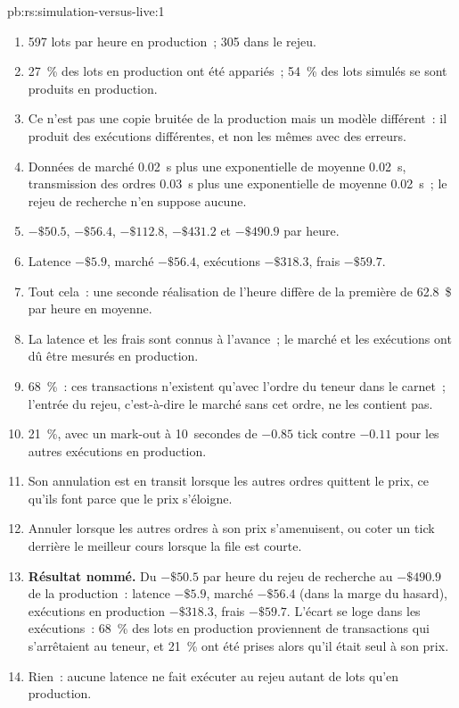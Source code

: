 \begin{solution}{pb:rs:simulation-versus-live:1}
\begin{enumerate}
\item 597 lots par heure en production~; 305 dans le rejeu.
\item 27~\% des lots en production ont été appariés~; 54~\% des lots simulés se sont produits en production.
\item Ce n'est pas une copie bruitée de la production mais un modèle différent~: il produit des exécutions différentes, et non les mêmes avec des erreurs.
\item Données de marché 0.02~s plus une exponentielle de moyenne 0.02~s, transmission des ordres 0.03~s plus une exponentielle de moyenne 0.02~s~; le rejeu de recherche n'en suppose aucune.
\item $-\$50.5$, $-\$56.4$, $-\$112.8$, $-\$431.2$ et $-\$490.9$ par heure.
\item Latence $-\$5.9$, marché $-\$56.4$, exécutions $-\$318.3$, frais $-\$59.7$.
\item Tout cela~: une seconde réalisation de l'heure diffère de la première de 62.8~\$ par heure en moyenne.
\item La latence et les frais sont connus à l'avance~; le marché et les exécutions ont dû être mesurés en production.
\item 68~\%~: ces transactions n'existent qu'avec l'ordre du teneur dans le carnet~; l'entrée du rejeu, c'est-à-dire le marché sans cet ordre, ne les contient pas.
\item 21~\%, avec un mark-out à 10~secondes de $-0.85$ tick contre $-0.11$ pour les autres exécutions en production.
\item Son annulation est en transit lorsque les autres ordres quittent le prix, ce qu'ils font parce que le prix s'éloigne.
\item Annuler lorsque les autres ordres à son prix s'amenuisent, ou coter un tick derrière le meilleur cours lorsque la file est courte.
\item \textbf{Résultat nommé.} Du $-\$50.5$ par heure du rejeu de recherche au $-\$490.9$ de la production~: latence $-\$5.9$, marché $-\$56.4$ (dans la marge du hasard), exécutions en production
$-\$318.3$, frais $-\$59.7$. L'écart se loge dans les exécutions~: 68~\% des lots en production proviennent de transactions qui s'arrêtaient au teneur, et 21~\% ont été prises alors qu'il était seul à son prix.
\item Rien~: aucune latence ne fait exécuter au rejeu autant de lots qu'en production.

\end{enumerate}
\end{solution}
